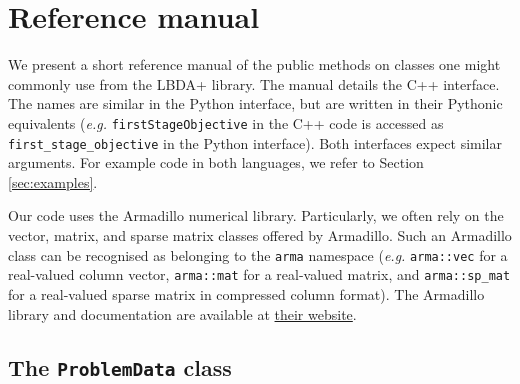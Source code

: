 \documentclass[12pt, english]{article}
\begin{document}
\section{Reference manual}
\label{sec:reference_manual}

We present a short reference manual of the public methods on classes one might commonly use from the
LBDA+ library. The manual details the C++ interface. The names are similar in the Python interface, but are written in their Pythonic equivalents (\textit{e.g.} \texttt{firstStageObjective} in the C++ code is accessed as \texttt{first\_stage\_objective} in the Python interface). Both interfaces expect similar arguments. For example code in both languages, we refer to Section \ref{sec:examples}.

Our code uses the Armadillo numerical library. Particularly, we often rely on the vector, matrix, and sparse matrix classes offered by Armadillo. Such an Armadillo class can be recognised as belonging to the \texttt{arma} namespace (\textit{e.g.} \texttt{arma::vec} for a real-valued column vector, \texttt{arma::mat} for a real-valued matrix, and \texttt{arma::sp\_mat} for a real-valued sparse matrix in compressed column format). The Armadillo library and documentation are available at \href{http://arma.sourceforge.net/}{their website}.

\subsection{The \texttt{ProblemData} class}
\label{subsec:problem_class}
\end{document}
